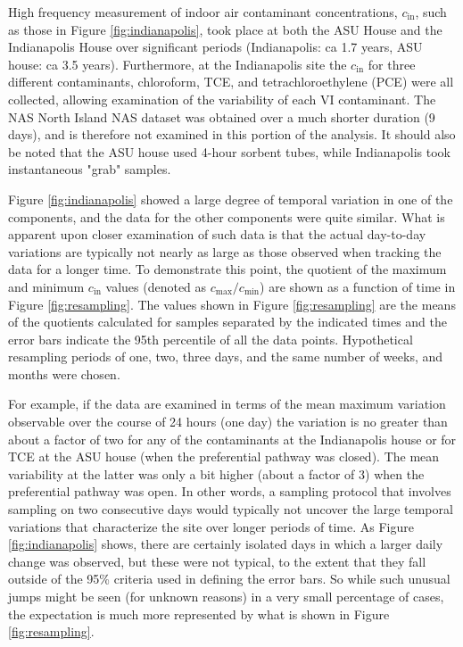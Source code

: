 \documentclass[journal=esthag,manuscript=article]{achemso}
\begin{document}
High frequency measurement of indoor air contaminant concentrations, $c_\mathrm{in}$, such as those in Figure \ref{fig:indianapolis}, took place at both the ASU House and the Indianapolis House over significant periods (Indianapolis: ca 1.7 years, ASU house: ca 3.5 years)\cite{u.s._environmental_protection_agency_assessment_2015,holton_temporal_2013}.
Furthermore, at the Indianapolis site the $c_\mathrm{in}$ for three different contaminants, chloroform, TCE, and tetrachloroethylene (PCE) were all collected, allowing examination of the variability of each VI contaminant.
The NAS North Island NAS dataset was obtained over a much shorter duration (9 days), and is therefore not examined in this portion of the analysis.
It should also be noted that the ASU house used 4-hour sorbent tubes, while Indianapolis took instantaneous "grab" samples.\par

Figure \ref{fig:indianapolis} showed a large degree of temporal variation in one of the components, and the data for the other components were quite similar.
What is apparent upon closer examination of such data is that the actual day-to-day variations are typically not nearly as large as those observed when tracking the data for a longer time.
To demonstrate this point, the quotient of the maximum and minimum $c_\mathrm{in}$ values (denoted as $c_\mathrm{max}/c_\mathrm{min}$) are shown as a function of time in Figure \ref{fig:resampling}.
The values shown in Figure \ref{fig:resampling} are the means of the quotients calculated for samples separated by the indicated times and the error bars indicate the 95th percentile of all the data points.
Hypothetical resampling periods of one, two, three days, and the same number of weeks, and months were chosen.\par

For example, if the data are examined in terms of the mean maximum variation observable over the course of 24 hours (one day) the variation is no greater than about a factor of two for any of the contaminants at the Indianapolis house or for TCE at the ASU house (when the preferential pathway was closed).
The mean variability at the latter was only a bit higher (about a factor of 3) when the preferential pathway was open.
In other words, a sampling protocol that involves sampling on two consecutive days would typically not uncover the large temporal variations that characterize the site over longer periods of time.
As Figure \ref{fig:indianapolis} shows, there are certainly isolated days in which a larger daily change was observed, but these were not typical, to the extent that they fall outside of the 95\% criteria used in defining the error bars.
So while such unusual jumps might be seen (for unknown reasons) in a very small percentage of cases, the expectation is much more represented by what is shown in Figure \ref{fig:resampling}.\par
\end{document}
